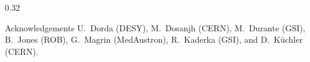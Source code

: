 \documentclass[final,xcolor=dvipsnames, 12pt]{beamer} %
\newlength{\mytextwidth}
\begin{document}
\begin{frame}[t]
\begin{columns}[T,totalwidth=1\textwidth]
\begin{column}{0.32\mytextwidth}
\vspace{3mm}

\begin{block}{Acknowledgements}
  {\small %
            U.~Dorda (DESY), %
            M.~Dosanjh (CERN), %
            M.~Durante (GSI), %
            B.~Jones (ROB), %
            G.~Magrin (MedAustron), %
            R.~Kaderka (GSI), and %
            D.~K\"uchler (CERN).%
   }
 \end{block}

\end{column}


\end{columns}
\end{frame}
\end{document}
